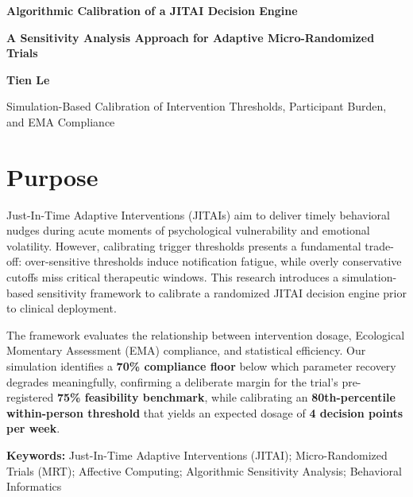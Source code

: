 \documentclass[10pt,letterpaper]{article}
\begin{document}
\begin{center}

{\LARGE\bfseries\color{primary}
Algorithmic Calibration of a JITAI Decision Engine}

\vspace{2pt}

{\large\bfseries\color{accent}
A Sensitivity Analysis Approach for Adaptive Micro-Randomized Trials}

\vspace{3pt}

{\normalsize\bfseries\color{primary}
Tien Le}

\vspace{2pt}

{\small
\textcolor{muted}{
Simulation-Based Calibration of Intervention Thresholds, Participant Burden, and EMA Compliance
}}

\end{center}

\vspace{-4pt}

\section{Purpose}

Just-In-Time Adaptive Interventions (JITAIs) aim to deliver timely behavioral nudges during acute moments of psychological vulnerability and emotional volatility. However, calibrating trigger thresholds presents a fundamental trade-off: over-sensitive thresholds induce notification fatigue, while overly conservative cutoffs miss critical therapeutic windows. This research introduces a simulation-based sensitivity framework to calibrate a randomized JITAI decision engine prior to clinical deployment.

The framework evaluates the relationship between intervention dosage, Ecological Momentary Assessment (EMA) compliance, and statistical efficiency. Our simulation identifies a \textbf{70\% compliance floor} below which parameter recovery degrades meaningfully, confirming a deliberate margin for the trial's pre-registered \textbf{75\% feasibility benchmark}, while calibrating an \textbf{80th-percentile within-person threshold} that yields an expected dosage of \textbf{4 decision points per week}.


{\footnotesize
\textbf{\color{primary}Keywords:}
Just-In-Time Adaptive Interventions (JITAI);
Micro-Randomized Trials (MRT);
Affective Computing;
Algorithmic Sensitivity Analysis;
Behavioral Informatics
}
\end{document}
